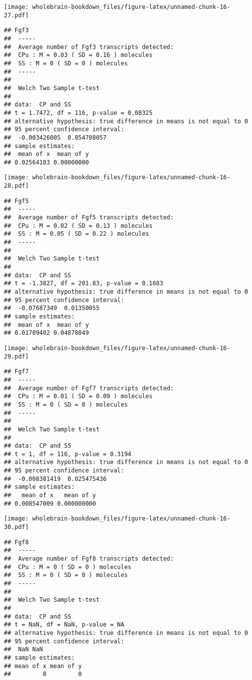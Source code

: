 \documentclass[]{book}
\theoremstyle{definition}
\theoremstyle{definition}
\theoremstyle{remark}
\begin{document}
\texttt{[image: wholebrain-bookdown\_files/figure-latex/unnamed-chunk-16-27.pdf]}

\begin{verbatim}
## Fgf3
##  -----
##  Average number of Fgf3 transcripts detected:
##  CPu : M = 0.03 ( SD = 0.16 ) molecules 
##  SS : M = 0 ( SD = 0 ) molecules
##  -----
## 
##  Welch Two Sample t-test
## 
## data:  CP and SS
## t = 1.7472, df = 116, p-value = 0.08325
## alternative hypothesis: true difference in means is not equal to 0
## 95 percent confidence interval:
##  -0.003426005  0.054708057
## sample estimates:
##  mean of x  mean of y 
## 0.02564103 0.00000000
\end{verbatim}

\texttt{[image: wholebrain-bookdown\_files/figure-latex/unnamed-chunk-16-28.pdf]}

\begin{verbatim}
## Fgf5
##  -----
##  Average number of Fgf5 transcripts detected:
##  CPu : M = 0.02 ( SD = 0.13 ) molecules 
##  SS : M = 0.05 ( SD = 0.22 ) molecules
##  -----
## 
##  Welch Two Sample t-test
## 
## data:  CP and SS
## t = -1.3827, df = 201.83, p-value = 0.1683
## alternative hypothesis: true difference in means is not equal to 0
## 95 percent confidence interval:
##  -0.07687349  0.01350055
## sample estimates:
##  mean of x  mean of y 
## 0.01709402 0.04878049
\end{verbatim}

\texttt{[image: wholebrain-bookdown\_files/figure-latex/unnamed-chunk-16-29.pdf]}

\begin{verbatim}
## Fgf7
##  -----
##  Average number of Fgf7 transcripts detected:
##  CPu : M = 0.01 ( SD = 0.09 ) molecules 
##  SS : M = 0 ( SD = 0 ) molecules
##  -----
## 
##  Welch Two Sample t-test
## 
## data:  CP and SS
## t = 1, df = 116, p-value = 0.3194
## alternative hypothesis: true difference in means is not equal to 0
## 95 percent confidence interval:
##  -0.008381419  0.025475436
## sample estimates:
##   mean of x   mean of y 
## 0.008547009 0.000000000
\end{verbatim}

\texttt{[image: wholebrain-bookdown\_files/figure-latex/unnamed-chunk-16-30.pdf]}

\begin{verbatim}
## Fgf8
##  -----
##  Average number of Fgf8 transcripts detected:
##  CPu : M = 0 ( SD = 0 ) molecules 
##  SS : M = 0 ( SD = 0 ) molecules
##  -----
## 
##  Welch Two Sample t-test
## 
## data:  CP and SS
## t = NaN, df = NaN, p-value = NA
## alternative hypothesis: true difference in means is not equal to 0
## 95 percent confidence interval:
##  NaN NaN
## sample estimates:
## mean of x mean of y 
##         0         0
\end{verbatim}
\end{document}

